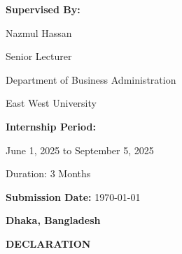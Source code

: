 \begin{titlepage}
    \vspace{1.5cm}
    \begin{minipage}{0.8\textwidth}
        \centering
        {\large \textbf{Supervised By:}}
        
        \vspace{0.4cm}
        {\normalsize Nazmul Hassan}
        
        \vspace{0.3cm}
        {\normalsize Senior Lecturer}
        
        \vspace{0.3cm}
        {\normalsize Department of Business Administration}
        
        \vspace{0.3cm}
        {\normalsize East West University}
    \end{minipage}
    
    \vspace{1.5cm}
    \begin{minipage}{0.8\textwidth}
        \centering
        {\large \textbf{Internship Period:}}
        
        \vspace{0.4cm}
        {\normalsize June 1, 2025 to September 5, 2025}
        
        \vspace{0.3cm}
        {\normalsize Duration: 3 Months}
    \end{minipage}
    
    \vfill
    {\large \textbf{Submission Date:} \today}
    
    \vspace{1cm}
    {\large \textbf{Dhaka, Bangladesh}}
    
\end{titlepage}

\newpage
\thispagestyle{empty}
\begingroup
\centering

\vspace*{2cm}
{\Large \textbf{DECLARATION}}

